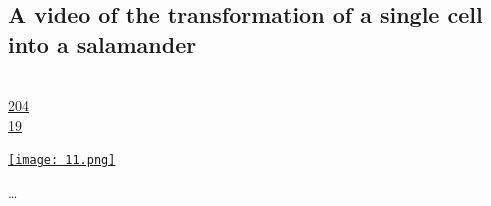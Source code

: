 \documentclass[10pt,a4paper]{article}
\begin{document}
\subsection{A video of the transformation of a single cell into a salamander}
\noindent\begin{minipage}[t]{0.19\linewidth}
\vspace{0pt}
\noindent\scshape\footnotesize
\\ {\scriptsize\faThumbsOUp}\space 
\href{http://news.ycombinator.com/item?id=37275401\&utm\_term=comment}{204} 
\\ {\scriptsize\faComments}\space 
\href{http://news.ycombinator.com/item?id=37275401\&utm\_term=comment}{19} 
\end{minipage} 
\begin{minipage}[t]{0.80\linewidth}
\vspace{0pt}
\begin{multicols}{2}
    \href{https://pmdvod.nationalgeographic.com/NG\_Video/772/995/1442844739770\_1550184269599\_1442865731523\_mp4\_video\_1024x576\_1632000\_primary\_audio\_eng\_3.mp4?utm\_source=hackernewsletter\&utm\_medium=email\&utm\_term=fav}{
        \texttt{[image: 11.png]}
    }

\dots
\end{multicols}
\end{minipage}
\par\medskip
\end{document}
